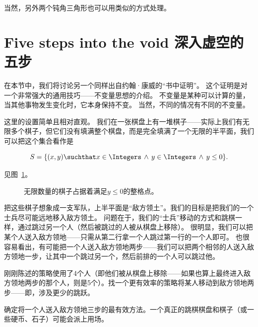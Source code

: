 当然，另外两个钝角三角形也可以用类似的方式处理。

\clearpage




\newpage

\section{Five steps into the void 深入虚空的五步}
\label{sec:5_steps}

在本节中，我们将讨论另一个同样出自约翰·康威的“书中证明”。
这个证明是对一个非常强大的通用技巧——不变量思想的介绍。
不变量是某种可以计算的量，当其他事物发生变化时，它本身保持不变。
当然，不同的情况有不同的不变量。

这里的设置简单且相对直观。
我们在一张棋盘上有一堆棋子——实际上我们有无限多个棋子，但它们没有填满整个棋盘，而是完全填满了一个无限的半平面，我们可以把这个集合看作是

\[ S = \{(x,y) \suchthat x \in \Integers \, \land \, y \in \Integers \, \land \, y \leq 0 \}. \]

见图~\ref{fig:the_army}。

\begin{figure}[!hbtp] 
\begin{center}

\end{center}
\caption[下半平面中的无限军队。]{无限数量的棋子占据着满足$y\leq 0$的整格点。}
\label{fig:the_army}
\end{figure}

把这些棋子想象成一支军队，上半平面是“敌方领土”。我们的目标是把我们的一个士兵尽可能远地移入敌方领土。
问题在于，我们的“士兵”移动的方式和跳棋一样，通过跳过另一个人（然后被跳过的人被从棋盘上移除）。
很明显，我们可以把某个人送入敌方领地——只需从第二行拿一个人跳过第一行的一个人即可。
也很容易看出，有可能把一个人送入敌方领地两步——我们可以把两个相邻的人送入敌方领地一步，让其中一个跳过另一个，然后前排的一个人可以跳过他。

\begin{exer}
刚刚陈述的策略使用了4个人（即他们被从棋盘上移除——如果也算上最终进入敌方领地两步的那个人，则是5个）。找一个更有效率的策略将某人移动到敌方领地两步——即，涉及更少的跳跃。
\end{exer}

\begin{exer}
确定将一个人送入敌方领地三步的最有效方法。一个真正的跳棋棋盘和棋子（或一些硬币、石子）可能会派上用场。
\end{exer}

